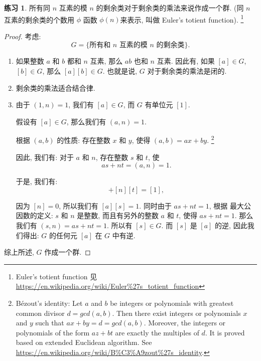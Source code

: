 \documentclass[utf8]{ctexbook}
\theoremstyle{definition}
\newtheorem{exercise}{练习}[section]
\begin{document}
\begin{exercise}\label{memo_euler_toient_function}
所有同 $n$ 互素的模 $n$ 的剩余类对于剩余类的乘法来说作成一个群. (同 $n$ 互素的剩余类的个数用 $\phi$ 函数 $ \phi (n) $来表示, 叫做 Euler's totient function). \footnote{Euler's totient function 见 \url{https://en.wikipedia.org/wiki/Euler\%27s\_totient\_function}}
\end{exercise}

\begin{proof}
考虑:
\begin{equation}
G = \{ \mbox{所有和 $n$ 互素的模 $n$ 的剩余类} \} .
\end{equation}

\begin{enumerate}
\item{如果整数 $a$ 和 $b$ 都和 $n$ 互素, 那么 $ab$ 也和 $n$ 互素. 因此有, 如果 $[a] \in G$, $[b] \in G$, 那么 $[a][b] \in G$. 也就是说, $G$ 对于剩余类的乘法是闭的.}
\item{剩余类的乘法适合结合律.}
\item{由于 $(1, n ) = 1$, 我们有 $[a] \in G$, 而 $G$ 有单位元 $[1]$.

假设有 $[a] \in G$, 那么我们有 $(a, n) = 1$. 

根据 $(a,b)$ 的性质: 存在整数 $x$ 和 $y$, 使得 $(a, b) = ax + by$. \footnote{\label{footnote_bezout_identity} Bézout's identity: Let $a$ and $b$ be integers or polynomials with greatest common divisor $d= gcd(a,b)$. Then there exist integers or polynomials $x$ and $y$ such that $ax + by = d = gcd(a,b)$. Moreover, the integers or polynomials of the form $az + bt$ are exactly the multiples of $d$. It is proved based on extended Euclidean algorithm. See \url{https://en.wikipedia.org/wiki/B\%C3\%A9zout\%27s\_identity}.}

因此, 我们有: 对于 $a$ 和 $n$, 存在整数 $s$ 和 $t$, 使
\begin{equation}
as + nt = (a, n) = 1 .
\end{equation}

于是, 我们有:
\begin{equation}
[a] [s] + [n][t] = [1] ,
\end{equation}

因为 $[n]=0$, 所以我们有 $[a][s] = 1$. 同时由于 $as + nt = 1 $, 根据 最大公因数的定义: $s$ 和 $n$ 是整数, 而且有另外的整数 $a$ 和 $t$, 使得 $as + nt = 1$. 那么我们有 $(s, n) = as + nt = 1$. 所以有 $[s] \in G$. 而 $[s]$ 是 $[a]$ 的逆, 因此我们得出: $G$ 的任何元 $[a]$ 在 $G$ 中有逆.
}
\end{enumerate}

综上所述, $G$ 作成一个群.
\end{proof}
\end{document}
